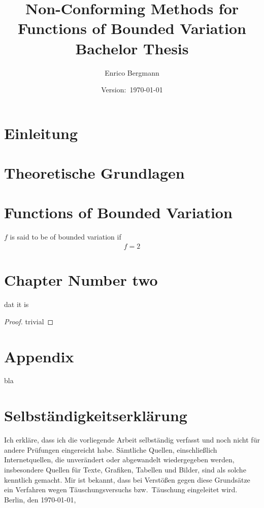 \documentclass[draft=false,twoside,12pt]{scrreprt}
\title{Non-Conforming Methods for Functions of Bounded Variation\\
Bachelor Thesis}
\author{Enrico Bergmann}
\date{Version:~\today}
\begin{document}
\maketitle
\tableofcontents

\chapter{Einleitung}


\chapter{Theoretische Grundlagen}


\chapter{Functions of Bounded Variation}

\begin{definition}
 $f$ is said to be of bounded variation if 
 \begin{align*}
   f=2
 \end{align*}
\end{definition}

\chapter{Chapter Number two}

\begin{theorem}
  dat it is
\end{theorem}

\begin{proof}
  trivial
\end{proof}


\appendix
\chapter{Appendix}
bla


\chapter*{Selbständigkeitserklärung}
Ich erkläre, dass ich die vorliegende Arbeit selbständig verfasst und noch nicht 
für andere Prüfungen eingereicht habe. Sämtliche Quellen, einschließlich
Internetquellen, die unverändert oder abgewandelt wiedergegeben werden,
insbesondere Quellen für Texte, Grafiken, Tabellen und Bilder, sind als solche
kenntlich gemacht. Mir ist bekannt, dass bei Verstößen gegen diese Grundsätze ein
Verfahren wegen Täuschungsversuchs bzw.\ Täuschung eingeleitet wird. \\

Berlin, den \today, 
\end{document}
